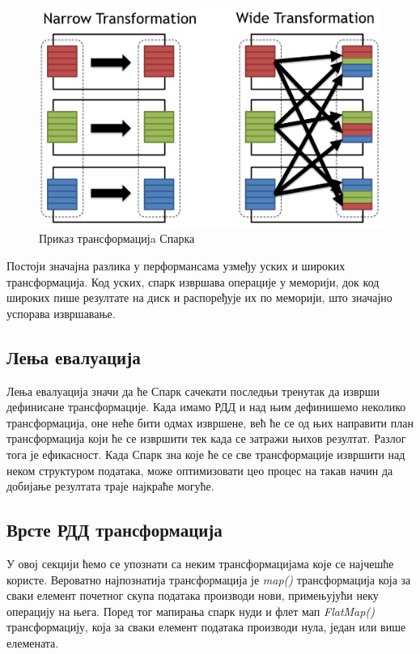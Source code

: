 \documentclass[12pt,oneside]{memoir}
\begin{document}
\begin{figure}[!ht]
  \centering
  \includegraphics[width=1\textwidth]{pictures/spark_transformation_types.png}
  \caption{Приказ трансформацијa Спарка}
  \label{fig:sprk_trnsf}
\end{figure}

Постоји значајна разлика у перформансама узмеђу уских и широких трансформација. Код уских, спарк извршава операције у меморији, док код широких пише резултате на диск и распоређује их по меморији, што значајно успорава извршавање. \cite{spark_guide}

\subsection{Лења евалуација}
\label{subsec:spark_lazy_eval}

Лења евалуација значи да ће Спарк сачекати последњи тренутак да изврши дефинисане трансформације. Када имамо РДД и над њим дефинишемо неколико трансформација, оне неће бити одмах извршене, већ ће се од њих направити план трансформација који ће се извршити тек када се затражи њихов резултат. Разлог тога је ефикасност. Када Спарк зна које ће се све трансформације извршити над неком структуром података, може оптимизовати цео процес на такав начин да добијање резултата траје најкраће могуће. \cite{spark_guide}

\subsection{Врсте РДД трансформација}
\label{subsec:spark_transformation_types}

У овој секцији ћемо се упознати са неким трансформацијама које се најчешће користе. Вероватно најпознатија трансформација је \textit{map()} трансформација која за сваки елемент почетног скупа података производи нови, примењујући неку операцију на њега. Поред тог мапирања спарк нуди и флет мап \textit{FlatMap()} трансформацију, која за сваки елемент података производи нула, један или више елемената.
\end{document}

